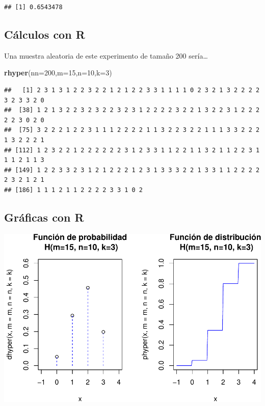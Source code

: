 \documentclass[]{book}
\newenvironment{Shaded}{\begin{snugshade}}{\end{snugshade}}
\newcommand{\DataTypeTok}[1]{\textcolor[rgb]{0.13,0.29,0.53}{#1}}
\newcommand{\DecValTok}[1]{\textcolor[rgb]{0.00,0.00,0.81}{#1}}
\newcommand{\KeywordTok}[1]{\textcolor[rgb]{0.13,0.29,0.53}{\textbf{#1}}}
\newcommand{\NormalTok}[1]{#1}
\begin{document}
\begin{verbatim}
## [1] 0.6543478
\end{verbatim}

\hypertarget{cuxe1lculos-con-r-12}{%
\subsection{Cálculos con R}\label{cuxe1lculos-con-r-12}}

Una muestra aleatoria de este experimento de tamaño 200 sería\ldots{}

\begin{Shaded}
\begin{Highlighting}[]
\KeywordTok{rhyper}\NormalTok{(}\DataTypeTok{nn=}\DecValTok{200}\NormalTok{,}\DataTypeTok{m=}\DecValTok{15}\NormalTok{,}\DataTypeTok{n=}\DecValTok{10}\NormalTok{,}\DataTypeTok{k=}\DecValTok{3}\NormalTok{)}
\end{Highlighting}
\end{Shaded}

\begin{verbatim}
##   [1] 2 3 1 3 1 2 2 3 2 2 1 2 1 2 2 3 3 1 1 1 1 0 2 3 2 1 3 2 2 2 2 3 2 3 3 2 0
##  [38] 1 2 1 3 2 2 3 2 3 2 2 3 2 3 1 2 2 2 2 3 2 2 1 3 2 2 3 1 2 2 2 2 2 3 0 2 0
##  [75] 3 2 2 2 1 2 2 3 1 1 1 2 2 2 2 1 1 3 2 2 3 2 2 1 1 1 3 3 2 2 2 1 3 2 2 2 1
## [112] 1 2 3 2 2 1 2 2 2 2 2 2 3 1 2 3 3 1 1 2 2 1 1 3 2 1 1 2 2 3 1 1 1 2 1 1 3
## [149] 1 2 2 3 3 2 3 1 2 1 2 2 2 1 2 3 1 3 3 3 2 2 1 3 3 1 1 2 2 2 2 2 3 2 1 2 1
## [186] 1 1 1 2 1 1 2 2 2 2 3 3 1 0 2
\end{verbatim}

\hypertarget{gruxe1ficas-con-r}{%
\subsection{Gráficas con R}\label{gruxe1ficas-con-r}}

\begin{center}\includegraphics{curso-probabilidad-udemy_files/figure-latex/unnamed-chunk-70-1} \end{center}
\end{document}
